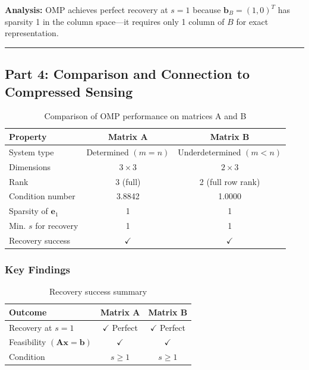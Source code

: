 \textbf{Analysis:} OMP achieves perfect recovery at $s=1$ because $\mathbf{b}_B = (1, 0)^T$ has sparsity 1 in the column space—it requires only 1 column of $B$ for exact representation.

\vspace{2em}
\noindent\rule{\textwidth}{0.4pt}

\clearpage
\subsection*{Part 4: Comparison and Connection to Compressed Sensing}

\begin{table}[h]
\centering
\begin{tabular}{lcc}
\toprule
Property & Matrix A & Matrix B \\
\midrule
System type & Determined $(m=n)$ & Underdetermined $(m<n)$ \\
Dimensions & $3 \times 3$ & $2 \times 3$ \\
Rank & 3 (full) & 2 (full row rank) \\
Condition number & 3.8842 & 1.0000 \\
Sparsity of $\mathbf{e}_1$ & 1 & 1 \\
Min. $s$ for recovery & 1 & 1 \\
Recovery success & $\checkmark$ & $\checkmark$ \\
\bottomrule
\end{tabular}
\caption{Comparison of OMP performance on matrices A and B}
\end{table}

\subsubsection*{Key Findings}

\begin{table}[h]
\centering
\begin{tabular}{lcc}
\toprule
Outcome & Matrix A & Matrix B \\
\midrule
Recovery at $s=1$ & $\checkmark$ Perfect & $\checkmark$ Perfect \\
Feasibility $(\mathbf{Ax}=\mathbf{b})$ & $\checkmark$ & $\checkmark$ \\
Condition & $s \geq 1$ & $s \geq 1$ \\
\bottomrule
\end{tabular}
\caption{Recovery success summary}
\end{table}

